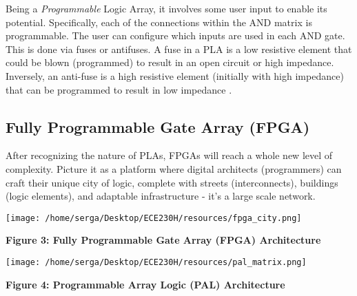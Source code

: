 \documentclass[12pt]{article}
\begin{document}
        Being a \textit{Programmable} Logic Array, it involves some user input to
        enable its potential. Specifically, each of the connections within the 
        AND matrix is programmable. The user can configure which inputs are used 
        in each AND gate. This is done via fuses or antifuses. A fuse in a PLA is
        a low resistive element that could be blown (programmed) to result in an 
        open circuit or high impedance. Inversely, an anti-fuse is a high resistive
        element (initially with high impedance) that can be programmed to result 
        in low impedance \autocite{cornell}. 

        \subsection{Fully Programmable Gate Array (FPGA)}

        After recognizing the nature of PLAs, FPGAs will reach a whole new level of
        complexity. Picture it as a platform where digital architects (programmers) 
        can craft their unique city of logic, complete with streets (interconnects), 
        buildings (logic elements), and adaptable infrastructure - it's a large 
        scale network.

        \begin{center}
            \vspace{0.15cm}

            \texttt{[image: /home/serga/Desktop/ECE230H/resources/fpga\_city.png]}
            
            \vspace{0.5cm}

            \textbf{Figure 3: Fully Programmable Gate Array (FPGA) Architecture} \autocite[1013]{231340}
            \label{fpga_city}
        
        \end{center}

        \begin{center}
            \vspace{0.5cm}

            \texttt{[image: /home/serga/Desktop/ECE230H/resources/pal\_matrix.png]}
            
            \vspace{0.5cm}

            \textbf{Figure 4: Programmable Array Logic (PAL) Architecture} \autocite[8]{Boutros2022}
            \label{pal_matrix}
        
        \end{center}
\end{document}
